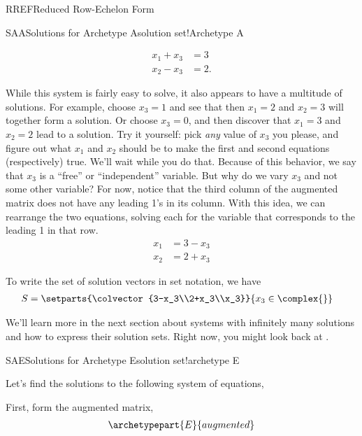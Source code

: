 \begin{subsect}{RREF}{Reduced Row-Echelon Form}
\begin{example}{SAA}{Solutions for Archetype A}{solution set!Archetype A}
\begin{para}
%
\begin{align*}
x_1+x_3&=3\\
x_2-x_3&=2.
\end{align*}\end{para}
%
\begin{para}While this system is fairly easy to solve, it also appears to have a multitude of solutions.  For example, choose $x_3=1$ and see that then $x_1=2$ and $x_2=3$ will together form a solution.  Or choose $x_3=0$, and then discover that $x_1=3$ and $x_2=2$ lead to a solution.  Try it yourself: pick {\em any} value of $x_3$ you please, and figure out what $x_1$ and $x_2$ should be to make the first and second equations (respectively) true.  We'll wait while you do that.  Because of this behavior, we say that $x_3$ is a ``free'' or ``independent'' variable.  But why do we vary $x_3$ and not some other variable?  For now, notice that the third column of the augmented matrix does not have any leading 1's in its column.  With this idea, we can rearrange the two equations, solving each for the variable that corresponds to the leading 1 in that row.
%
\begin{align*}
x_1&=3-x_3\\
x_2&=2+x_3
\end{align*}
\end{para}
%
\begin{para}To write the set of solution vectors in set notation, we have
\begin{align*}
S&=\setparts{\colvector{3-x_3\\2+x_3\\x_3}}{x_3\in\complex{\null}}
\end{align*}\end{para}
%
\begin{para}We'll learn more in the next section about systems with infinitely many solutions and how to express their solution sets.  Right now, you might look back at  .\end{para}
\end{example}
%
\begin{example}{SAE}{Solutions for Archetype E}{solution set!archetype E}
\begin{para}Let's find the solutions to the following system of equations,
\end{para}
%
\begin{para}First, form the augmented matrix,
\begin{align*}
\archetypepart{E}{augmented}\end{align*}

\end{para}
\end{example}
\end{subsect}
